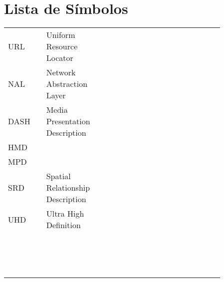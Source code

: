\chapter*{Lista de Símbolos}

\noindent
\pagestyle{fancy}

\begin{longtable}{l l l p{0.86\linewidth}}
URL 	&   & Uniform Resource Locator & \\
NAL		& 	& Network Abstraction Layer & \\
DASH 	&  	& Media Presentation Description & \\
HMD 	&  	&  & \\
MPD 	&  	&  & \\
SRD     & 	& Spatial Relationship Description & \\
 UHD   &  & Ultra High Definition & \\
    &  &  & \\
    &  &  & \\
    &  &  & \\
    &  &  & \\
    &  &  & \\
    &  &  & \\
    &  &  & \\
    &  &  & \\
    &  &  & \\
    &  &  & \\
    &  &  & \\
    &  &  & \\
    &  &  & \\
    &  &  & \\
    &  &  & \\



\end{longtable}